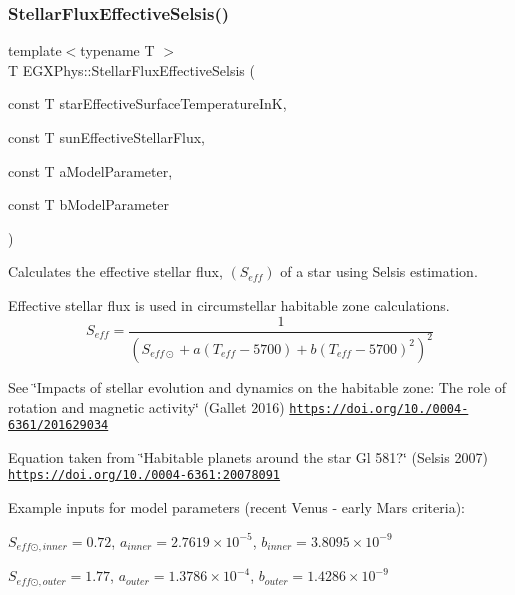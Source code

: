 \subsubsection{\texorpdfstring{Stellar\+Flux\+Effective\+Selsis()}{StellarFluxEffectiveSelsis()}}
{\footnotesize\ttfamily template$<$typename T $>$ \\
T E\+G\+X\+Phys\+::\+Stellar\+Flux\+Effective\+Selsis (\begin{DoxyParamCaption}\item[{const T}]{star\+Effective\+Surface\+Temperature\+InK,  }\item[{const T}]{sun\+Effective\+Stellar\+Flux,  }\item[{const T}]{a\+Model\+Parameter,  }\item[{const T}]{b\+Model\+Parameter }\end{DoxyParamCaption})}



Calculates the effective stellar flux, $(S_{eff})$ of a star using Selsis estimation. 

Effective stellar flux is used in circumstellar habitable zone calculations. \[S_{eff}= \frac{1}{(S_{eff\odot}+a(T_{eff}-5700)+b(T_{eff}-5700)^2)^2}\]

See \char`\"{}\+Impacts of stellar evolution and dynamics on the habitable zone\+: The role of rotation and magnetic activity\char`\"{} (Gallet 2016) \href{https://doi.org/10.1051/0004-6361/201629034}{\tt https\+://doi.\+org/10./0004-\/6361/201629034}

Equation taken from \char`\"{}\+Habitable planets around the star Gl 581?\char`\"{} (Selsis 2007) \href{https://doi.org/10.1051/0004-6361:20078091}{\tt https\+://doi.\+org/10./0004-\/6361\+:20078091}

Example inputs for model parameters (recent Venus -\/ early Mars criteria)\+:

$S_{eff\odot,inner} = 0.72$, $a_{inner} = 2.7619 \times 10^{-5}$, $b_{inner} = 3.8095 \times 10^{-9}$

$S_{eff\odot,outer} = 1.77$, $a_{outer} = 1.3786 \times 10^{-4}$, $b_{outer} = 1.4286 \times 10^{-9}$


